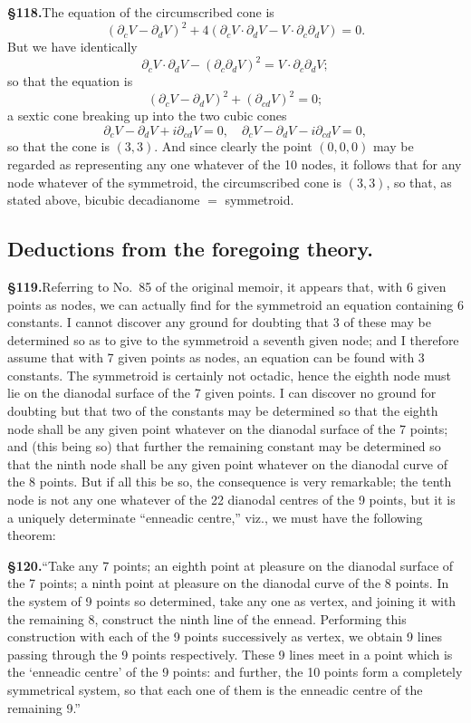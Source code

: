 \documentclass[11pt,a4paper]{article}
\begin{document}
\textbf{\S 118.}\quad The equation of the circumscribed cone is
\[
(\partial_c V - \partial_d V)^2 + 4(\partial_c V \cdot \partial_d V - V \cdot \partial_c \partial_d V) = 0.
\]
But we have identically
\[
\partial_c V \cdot \partial_d V - (\partial_c \partial_d V)^2 = V \cdot \partial_c \partial_d V;
\]
so that the equation is
\[
(\partial_c V - \partial_d V)^2 + (\partial_{cd} V)^2 = 0;
\]
a sextic cone breaking up into the two cubic cones
\[
\partial_c V - \partial_d V + i\partial_{cd} V = 0,\quad \partial_c V - \partial_d V - i\partial_{cd} V = 0,
\]
so that the cone is $(3, 3)$. And since clearly the point $(0, 0, 0)$ may be regarded as representing any one whatever of the 10 nodes, it follows that for any node whatever of the symmetroid, the circumscribed cone is $(3, 3)$, so that, as stated above, bicubic decadianome $=$ symmetroid.

\subsection*{Deductions from the foregoing theory.}

\textbf{\S 119.}\quad Referring to No.~85 of the original memoir, it appears that, with 6 given points as nodes, we can actually find for the symmetroid an equation containing 6 constants. I cannot discover any ground for doubting that 3 of these may be determined so as to give to the symmetroid a seventh given node; and I therefore assume that with 7 given points as nodes, an equation can be found with 3 constants. The symmetroid is certainly not octadic, hence the eighth node must lie on the dianodal surface of the 7 given points. I can discover no ground for doubting but that two of the constants may be determined so that the eighth node shall be any given point whatever on the dianodal surface of the 7 points; and (this being so) that further the remaining constant may be determined so that the ninth node shall be any given point whatever on the dianodal curve of the 8 points. But if all this be so, the consequence is very remarkable; the tenth node is not any one whatever of the 22 dianodal centres of the 9 points, but it is a uniquely determinate ``enneadic centre,'' viz., we must have the following theorem:

\textbf{\S 120.}\quad ``Take any 7 points; an eighth point at pleasure on the dianodal surface of the 7 points; a ninth point at pleasure on the dianodal curve of the 8 points. In the system of 9 points so determined, take any one as vertex, and joining it with the remaining 8, construct the ninth line of the ennead. Performing this construction with each of the 9 points successively as vertex, we obtain 9 lines passing through the 9 points respectively. These 9 lines meet in a point which is the `enneadic centre' of the 9 points: and further, the 10 points form a completely symmetrical system, so that each one of them is the enneadic centre of the remaining 9.''
\end{document}
